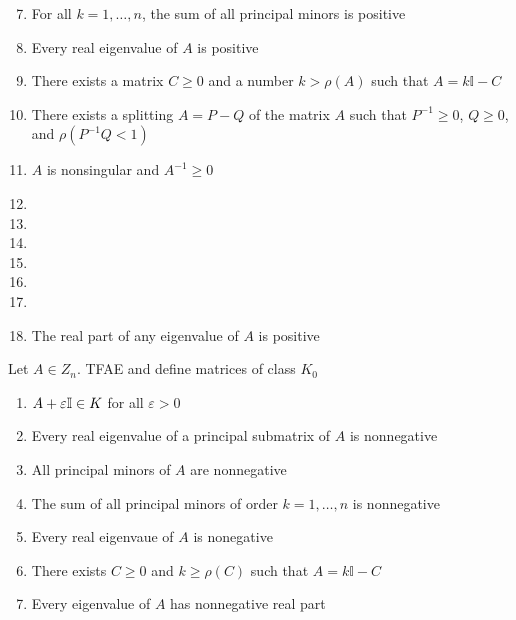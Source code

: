 \documentclass[aspectratio=169]{beamer}
\begin{document}
\begin{frame}
	\addtocounter{theorem}{-1}
	\begin{theorem}
	\begin{enumerate}
		\setcounter{enumi}{6}
		\item For all $k= 1, \dots, n$, the sum of all principal minors is positive
		\item Every real eigenvalue of $A$ is positive
		\item There exists a matrix $C\geq 0$ and a number $k > \rho(A)$ such that $A= k\mathbb{I}-C$
		\item There exists a splitting $A=P-Q$ of the matrix $A$ such that $P^{-1}\geq 0$, $Q\geq 0$, and $\rho(P^{-1}Q<1)$
		\item $A$ is nonsingular and $A^{-1}\geq 0$
		\label{th:Fiedler2008_11}
		\item
		\item
		\item
		\item
		\item
		\item
		\item The real part of any eigenvalue of $A$ is positive \label{th:Fiedler2008_18}
	\end{enumerate}
	\end{theorem}
\end{frame}
	

\begin{frame}
	\begin{theorem}
	\label{th:Fiedler2008_K0}
	Let $A\in Z_n$. TFAE and define matrices of class $K_0$
	\begin{enumerate}
		\item $A+\varepsilon \mathbb{I}\in K$ for all $\varepsilon>0$ 
		\label{th:Fiedler2008_K0_1}
		\item Every real eigenvalue of a principal submatrix of $A$ is nonnegative
		\item All principal minors of $A$ are nonnegative
		\item The sum of all principal minors of order $k= 1, \dots, n$ is nonnegative
		\item Every real eigenvaue of $A$ is nonegative
		\label{th:Fiedler2008_K0_5}
		\item There exists $C\geq 0$ and $k\geq \rho(C)$ such that $A= k \mathbb{I}-C$
		\item Every eigenvalue of $A$ has nonnegative real part
	\end{enumerate}
	\end{theorem}
\end{frame}
	
\end{document}
